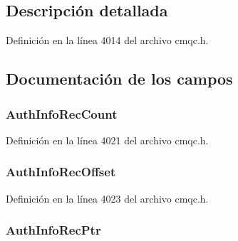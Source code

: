 \subsection{Descripción detallada}


Definición en la línea 4014 del archivo cmqc.\+h.



\subsection{Documentación de los campos}
\hypertarget{structtag_m_q_s_c_o_a080c9c24770964482da6331fa087f9a3}{}
\subsubsection[{Auth\+Info\+Rec\+Count}]{ Auth\+Info\+Rec\+Count}\label{structtag_m_q_s_c_o_a080c9c24770964482da6331fa087f9a3}


Definición en la línea 4021 del archivo cmqc.\+h.

\hypertarget{structtag_m_q_s_c_o_ae39127aab29444bb9cb49734645fbc10}{}
\subsubsection[{Auth\+Info\+Rec\+Offset}]{ Auth\+Info\+Rec\+Offset}\label{structtag_m_q_s_c_o_ae39127aab29444bb9cb49734645fbc10}


Definición en la línea 4023 del archivo cmqc.\+h.

\hypertarget{structtag_m_q_s_c_o_abb6923732084392b1be222ef7fc53847}{}
\subsubsection[{Auth\+Info\+Rec\+Ptr}]{ Auth\+Info\+Rec\+Ptr}\label{structtag_m_q_s_c_o_abb6923732084392b1be222ef7fc53847}


